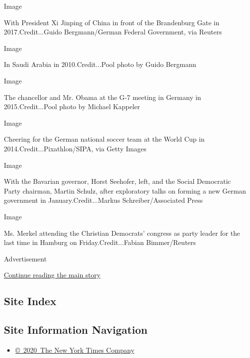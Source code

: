 Image

With President Xi Jinping of China in front of the Brandenburg Gate in
2017.Credit...Guido Bergmann/German Federal Government, via Reuters

Image

In Saudi Arabia in 2010.Credit...Pool photo by Guido Bergmann

Image

The chancellor and Mr. Obama at the G-7 meeting in Germany in
2015.Credit...Pool photo by Michael Kappeler

Image

Cheering for the German national soccer team at the World Cup in
2014.Credit...Pixathlon/SIPA, via Getty Images

Image

With the Bavarian governor, Horst Seehofer, left, and the Social
Democratic Party chairman, Martin Schulz, after exploratory talks on
forming a new German government in January.Credit...Markus
Schreiber/Associated Press

Image

Ms. Merkel attending the Christian Democrats' congress as party leader
for the last time in Hamburg on Friday.Credit...Fabian Bimmer/Reuters

Advertisement

\protect\hyperlink{after-bottom}{Continue reading the main story}

\hypertarget{site-index}{%
\subsection{Site Index}\label{site-index}}

\hypertarget{site-information-navigation}{%
\subsection{Site Information
Navigation}\label{site-information-navigation}}

\begin{itemize}
\tightlist
\item
  \href{https://help.nytimes3xbfgragh.onion/hc/en-us/articles/115014792127-Copyright-notice}{©~2020~The
  New York Times Company}
\end{itemize}

